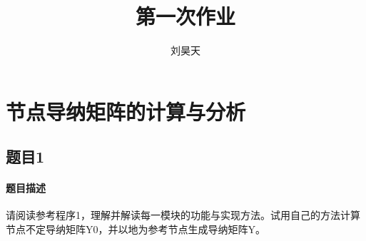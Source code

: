 \documentclass[a4paper,12pt]{article}
\title{第一次作业}
\author{刘昊天}
\begin{document}
    \maketitle
    \section{节点导纳矩阵的计算与分析}
    \subsection{题目1}
    \paragraph{题目描述} 请阅读参考程序1，理解并解读每一模块的功能与实现方法。试用自己的方法计算节点不定导纳矩阵Y0，并以地为参考节点生成导纳矩阵Y。
\end{document}
